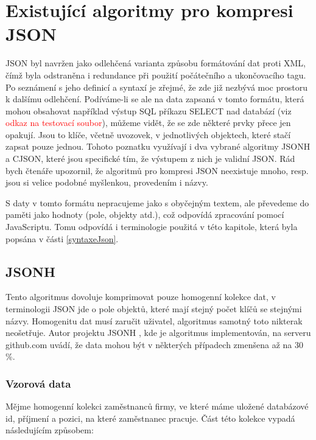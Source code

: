 \chapter{Existující algoritmy pro kompresi JSON}
\label{kapitolaJsonAlgoritmy}

JSON byl navržen jako odlehčená varianta způsobu formátování dat proti XML, čímž byla odstraněna i redundance při použití počátečního a ukončovacího tagu. Po seznámení s jeho definicí a syntaxí je zřejmé, že zde již nezbývá moc prostoru k dalšímu odlehčení. Podíváme-li se ale na data zapsaná v tomto formátu, která mohou obsahovat například výstup SQL příkazu SELECT nad databází (viz \textcolor{red}{odkaz na testovací soubor}), můžeme vidět, že se zde některé prvky přece jen opakují. Jsou to klíče, včetně uvozovek, v jednotlivých objektech, které stačí zapsat pouze jednou. Tohoto poznatku využívají i dva vybrané algoritmy JSONH a CJSON, které jsou specifické tím, že výstupem z nich je validní JSON. Rád bych čtenáře upozornil, že algoritmů pro kompresi JSON neexistuje mnoho, resp. jsou si velice podobné myšlenkou, provedením i názvy.

S daty v tomto formátu nepracujeme jako s obyčejným textem, ale převedeme do paměti jako hodnoty (pole, objekty atd.), což odpovídá zpracování pomocí JavaScriptu. Tomu odpovídá i terminologie použitá v této kapitole, která byla popsána v části \ref{syntaxeJson}.

\section{JSONH}
\label{jsonh}
Tento algoritmus dovoluje komprimovat pouze homogenní kolekce dat, v terminologii JSON jde o pole objektů, které mají stejný počet klíčů se stejnými názvy. Homogenitu dat musí zaručit uživatel, algoritmus samotný toto nikterak neošetřuje. Autor projektu JSONH \cite{jsonh}, kde je algoritmus implementován, na serveru github.com uvádí, že data mohou být v některých případech zmenšena až na 30 \%.

\subsection{Vzorová data}
Mějme homogenní kolekci zaměstnanců firmy, ve které máme uložené databázové id, příjmení a pozici, na které zaměstnanec pracuje. Část této kolekce vypadá následujícím způsobem:

